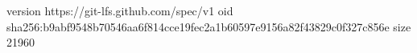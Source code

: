 version https://git-lfs.github.com/spec/v1
oid sha256:b9abf9548b70546aa6f814cce19fec2a1b60597e9156a82f43829c0f327c856e
size 21960
